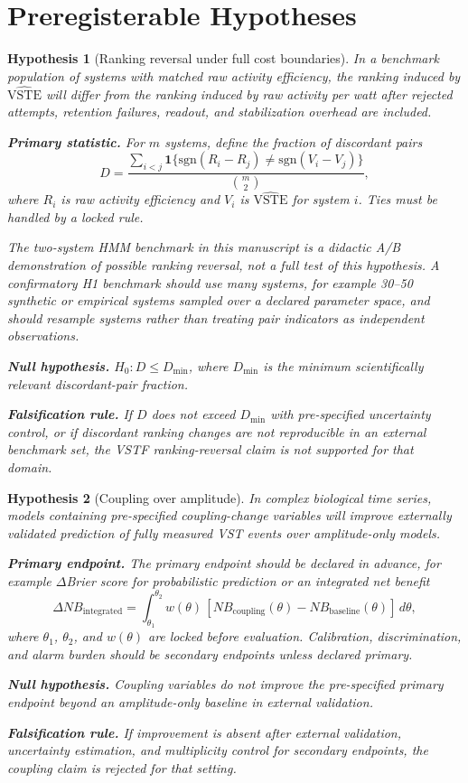 \documentclass[11pt,a4paper]{article}
\newtheorem{hypothesis}{Hypothesis}
\newcommand{\VSTE}{\ensuremath{\mathrm{VSTE}}}
\newcommand{\1}{\mathbf{1}}
\begin{document}
\section{Preregisterable Hypotheses}

\begin{hypothesis}[Ranking reversal under full cost boundaries]
In a benchmark population of systems with matched raw activity efficiency, the ranking induced by $\widehat{\VSTE}$ will differ from the ranking induced by raw activity per watt after rejected attempts, retention failures, readout, and stabilization overhead are included.

\noindent\textbf{Primary statistic.} For $m$ systems, define the fraction of discordant pairs
\[
  D=
  \frac{
  \sum_{i<j}
  \1\{\mathrm{sgn}(R_i-R_j)\neq \mathrm{sgn}(V_i-V_j)\}
  }{\binom{m}{2}},
\]
where $R_i$ is raw activity efficiency and $V_i$ is $\widehat{\VSTE}$ for system $i$. Ties must be handled by a locked rule.

The two-system HMM benchmark in this manuscript is a didactic A/B demonstration of possible ranking reversal, not a full test of this hypothesis. A confirmatory H1 benchmark should use many systems, for example 30--50 synthetic or empirical systems sampled over a declared parameter space, and should resample systems rather than treating pair indicators as independent observations.

\noindent\textbf{Null hypothesis.} $H_0:D\leq D_{\min}$, where $D_{\min}$ is the minimum scientifically relevant discordant-pair fraction.

\noindent\textbf{Falsification rule.} If $D$ does not exceed $D_{\min}$ with pre-specified uncertainty control, or if discordant ranking changes are not reproducible in an external benchmark set, the VSTF ranking-reversal claim is not supported for that domain.
\end{hypothesis}

\begin{hypothesis}[Coupling over amplitude]
In complex biological time series, models containing pre-specified coupling-change variables will improve externally validated prediction of fully measured VST events over amplitude-only models.

\noindent\textbf{Primary endpoint.} The primary endpoint should be declared in advance, for example $\Delta$Brier score for probabilistic prediction or an integrated net benefit
\[
  \Delta NB_{\mathrm{integrated}}
  =
  \int_{\theta_1}^{\theta_2}
  w(\theta)\,[NB_{\mathrm{coupling}}(\theta)-NB_{\mathrm{baseline}}(\theta)]\,d\theta,
\]
where $\theta_1$, $\theta_2$, and $w(\theta)$ are locked before evaluation. Calibration, discrimination, and alarm burden should be secondary endpoints unless declared primary.

\noindent\textbf{Null hypothesis.} Coupling variables do not improve the pre-specified primary endpoint beyond an amplitude-only baseline in external validation.

\noindent\textbf{Falsification rule.} If improvement is absent after external validation, uncertainty estimation, and multiplicity control for secondary endpoints, the coupling claim is rejected for that setting.
\end{hypothesis}
\end{document}
